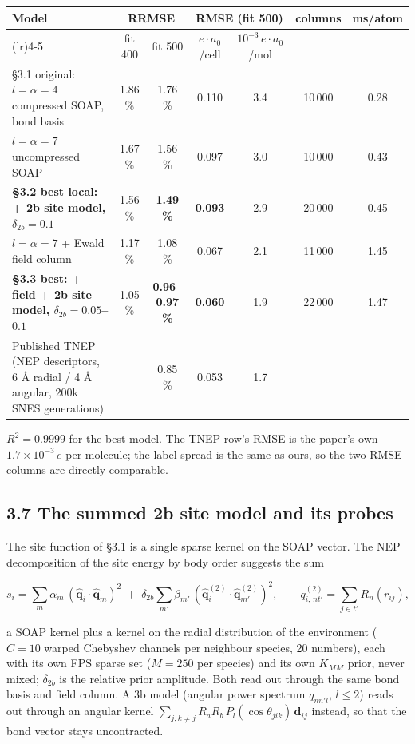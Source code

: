 \documentclass[11pt,a4paper]{article}
\begin{document}
\begin{center}\footnotesize\setlength{\tabcolsep}{4pt}
\begin{tabular}{@{}>{\raggedright\arraybackslash}p{4.4cm}cccccc@{}}
\toprule
Model & \multicolumn{2}{c}{RRMSE} & \multicolumn{2}{c}{RMSE (fit 500)} & columns & ms/atom \\
\cmidrule(lr){2-3}\cmidrule(lr){4-5}
 & fit 400 & fit 500 & $e\cdot a_0$/cell & $10^{-3}\,e\cdot a_0$/mol & & \\
\midrule
§3.1 original: $l=\alpha=4$ compressed SOAP, bond basis & 1.86 \% & 1.76 \% & 0.110 & 3.4 & 10\,000 & 0.28 \\
$l=\alpha=7$ uncompressed SOAP & 1.67 \% & 1.56 \% & 0.097 & 3.0 & 10\,000 & 0.43 \\
\textbf{§3.2 best local: + 2b site model, $\delta_{2b}=0.1$} & 1.56 \% & \textbf{1.49 \%} & \textbf{0.093} & 2.9 & 20\,000 & 0.45 \\
$l=\alpha=7$ + Ewald field column & 1.17 \% & 1.08 \% & 0.067 & 2.1 & 11\,000 & 1.45 \\
\textbf{§3.3 best: + field + 2b site model, $\delta_{2b}=0.05$--$0.1$} & 1.05 \% & \textbf{0.96--0.97 \%} & \textbf{0.060} & 1.9 & 22\,000 & 1.47 \\
Published TNEP (NEP descriptors, 6 \AA{} radial / 4 \AA{} angular, 200k SNES generations) & & 0.85 \% & 0.053 & 1.7 & & \\
\bottomrule
\end{tabular}
\end{center}

\(R^2=0.9999\) for the best model. The TNEP row's RMSE is the paper's own \(1.7\times10^{-3}\,e\)
per molecule; the label spread is the same as ours, so the two RMSE columns are directly comparable.

\subsection{3.7 The summed 2b site model and its
probes}\label{the-summed-2b-site-model-and-its-probes}

The site function of §3.1 is a single sparse kernel on the SOAP vector. The NEP decomposition of the
site energy by body order suggests the sum

\[
s_i = \sum_m \alpha_m\,(\hat{\mathbf q}_i\cdot\hat{\mathbf q}_m)^{2}
\;+\;\delta_{2b}\sum_{m'} \beta_{m'}\,(\hat{\mathbf q}^{(2)}_i\cdot\hat{\mathbf q}^{(2)}_{m'})^{2},
\qquad
q^{(2)}_{i,\,n t'} = \sum_{j\in t'} R_n(r_{ij}),
\]

a SOAP kernel plus a kernel on the radial distribution of the environment (\(C=10\) warped Chebyshev
channels per neighbour species, 20 numbers), each with its own FPS sparse set (\(M=250\) per
species) and its own \(K_{MM}\) prior, never mixed; \(\delta_{2b}\) is the relative prior amplitude.
Both read out through the same bond basis and field column. A 3b model (angular power spectrum
\(q_{nn'l}\), \(l\le2\)) reads out through an angular kernel
\(\sum_{j,k\ne j}R_aR_b\,P_l(\cos\theta_{jik})\,\mathbf d_{ij}\) instead, so that the bond vector
stays uncontracted.
\end{document}

